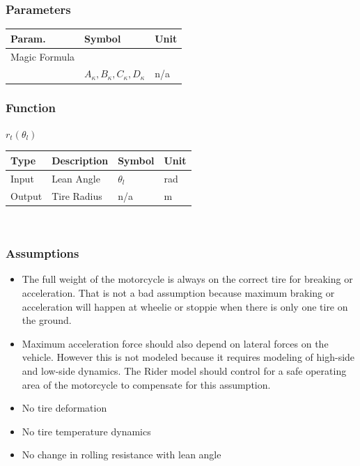 \documentclass[../SimBALink.tex]{subfiles}
\begin{document}
\subsubsection{Parameters}
	\begin{tabular}{ l | l | l  }
		Param.					&	Symbol		&	Unit		\\	\hline
		 Magic Formula\\		&	$A_{\kappa},B_{\kappa},C_{\kappa},D_{\kappa}$		&	 n/a \\
	\end{tabular}
	
\subsubsection{Function}
$r_t(\theta_l)$ \\
	\begin{tabular}{ l | l | l | l }
		Type				& Description		&	Symbol		&	Unit		\\	\hline
		Input 				& Lean Angle		&	$\theta_l$  & 	rad		\\
		Output 				& Tire Radius		&	n/a			&	m
	\end{tabular} \\

\subsubsection{Assumptions}
\begin{itemize}
  \item The full weight of the motorcycle is always on the correct tire for breaking or acceleration. That is not a bad assumption because maximum braking or acceleration will happen at wheelie or stoppie when there is only one tire on the ground.
  \item Maximum acceleration force should also depend on lateral forces on the vehicle. However this is not modeled because it requires modeling of high-side and low-side dynamics. The Rider model should control for a safe operating area of the motorcycle to compensate for this assumption. 
  \item No tire deformation
  \item No tire temperature dynamics
  \item No change in rolling resistance with lean angle 
\end{itemize}
\end{document}
